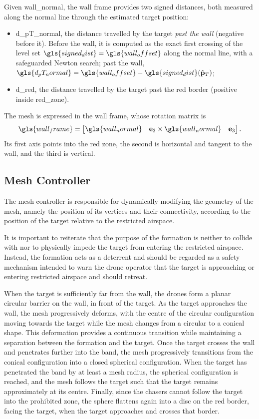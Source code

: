 Given \gls{wall_normal}, the wall frame provides two signed distances, both measured along the normal line through the estimated target position:
\begin{itemize}
    \item \gls{d_pT_normal}, the distance travelled by the target \emph{past the wall} (negative before it). Before the wall, it is computed as the exact first crossing of the level set $\gls{signed_dist}=\gls{wall_offset}$ along the normal line, with a safeguarded Newton search; past the wall, $\gls{d_pT_normal}=\gls{wall_offset}-\gls{signed_dist}(\hat{\mathbf{p}}_T)$;
    \item \gls{d_red}, the distance travelled by the target past the red border (positive inside \gls{red_zone}).
\end{itemize}
The mesh is expressed in the wall frame, whose rotation matrix is
\begin{equation}
    \gls{wall_frame}=\begin{bmatrix}\gls{wall_normal} & \mathbf{e}_3\times\gls{wall_normal} & \mathbf{e}_3\end{bmatrix}.
    \label{eq.6:wall_frame}
\end{equation}
Its first axis points into the red zone, the second is horizontal and tangent to the wall, and the third is vertical.

\subsection{Mesh Controller} \label{sec.6:mesh_controller}

The mesh controller is responsible for dynamically modifying the geometry of the mesh, namely the position of its vertices and their connectivity, according to the position of the target relative to the restricted airspace.

It is important to reiterate that the purpose of the formation is neither to collide with nor to physically impede the target from entering the restricted airspace. Instead, the formation acts as a deterrent and should be regarded as a safety mechanism intended to warn the drone operator that the target is approaching or entering restricted airspace and should retreat.

When the target is sufficiently far from the wall, the drones form a planar circular barrier on the wall, in front of the target. As the target approaches the wall, the mesh progressively deforms, with the centre of the circular configuration moving towards the target while the mesh changes from a circular to a conical shape. This deformation provides a continuous transition while maintaining a separation between the formation and the target. Once the target crosses the wall and penetrates further into the band, the mesh progressively transitions from the conical configuration into a closed spherical configuration. When the target has penetrated the band by at least a mesh radius, the spherical configuration is reached, and the mesh follows the target such that the target remains approximately at its centre. Finally, since the chasers cannot follow the target into the prohibited zone, the sphere flattens again into a disc on the red border, facing the target, when the target approaches and crosses that border.

